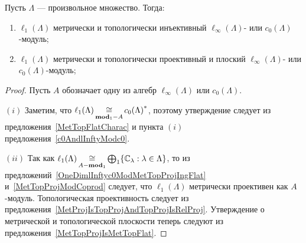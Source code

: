 \begin{proposition}\label{c0AndlInftyModl1} Пусть $\Lambda$ --- произвольное
множество. Тогда:

\begin{enumerate}[label = (\roman*)]
    \item $\ell_1(\Lambda)$ метрически и топологически инъективный
    $\ell_\infty(\Lambda)$- или $c_0(\Lambda)$-модуль;

    \item$\ell_1(\Lambda)$ метрически и топологически проективный и плоский
    $\ell_\infty(\Lambda)$- или $c_0(\Lambda)$-модуль;
\end{enumerate}
\end{proposition}
\begin{proof} Пусть $A$ обозначает одну из алгебр $\ell_\infty(\Lambda)$ или
$c_0(\Lambda)$.

$(i)$ Заметим, что $\ell_1(\Lambda)\mathop{\mathbin{\cong}}\limits_{\mathbf{mod}_1-A}{c_0(\Lambda)}^*$,
поэтому утверждение следует из предложения~\ref{MetTopFlatCharac} и пункта $(i)$
предложения~\ref{c0AndlInftyModc0}.

$(ii)$ Так как $\ell_1(\Lambda)\mathop{\mathbin{\cong}}\limits_{A-\mathbf{mod}_1}\bigoplus_1
\{\mathbb{C}_\lambda:\lambda\in\Lambda \}$, то из
предложений~\ref{OneDimlInftyc0ModMetTopProjIngFlat} и~\ref{MetTopProjModCoprod}
следует, что $\ell_1(\Lambda)$ метрически проективен как $A$-модуль.
Топологическая проективность следует из
предложения~\ref{MetProjIsTopProjAndTopProjIsRelProj}. Утверждение о метрической
и топологической плоскости теперь следуют из
предложения~\ref{MetTopProjIsMetTopFlat}.
\end{proof}

